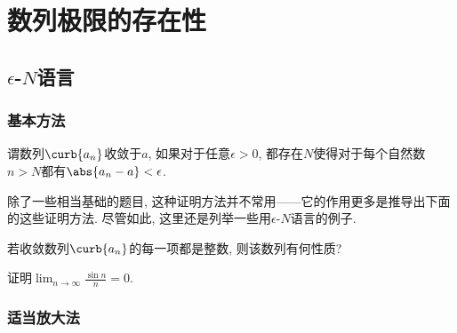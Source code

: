 \documentclass{ctexart}
\begin{document}

\section{数列极限的存在性} %
\label{sec:数列极限的存在性}

\subsection{\texorpdfstring{$\epsilon$-$N$语言}{按定义得到}} %
\label{sub:按定义得到}

\subsubsection{基本方法} %
\label{ssub:基本方法}

\begin{definition}[$\epsilon$-$N$语言]
    谓数列$\curb{a_n}$收敛于$a$, 如果对于任意$\epsilon>0$, 都存在$N$使得对于每个自然数$n>N$都有$\abs{a_n-a}<\epsilon$.
\end{definition}
除了一些相当基础的题目, 这种证明方法并不常用——它的作用更多是推导出下面的这些证明方法. 尽管如此, 这里还是列举一些用$\epsilon$-$N$语言的例子.
\begin{sample}
    \begin{ex}
        若收敛数列$\curb{a_n}$的每一项都是整数, 则该数列有何性质?
    \end{ex}
\end{sample}
\begin{sample}
    \begin{ex}
        证明$\displaystyle\lim_{n\rightarrow\infty} \frac{\sin n}{n} = 0$.
    \end{ex}
\end{sample}


\subsubsection{适当放大法} %
\label{ssub:适当放大法}
\end{document}

